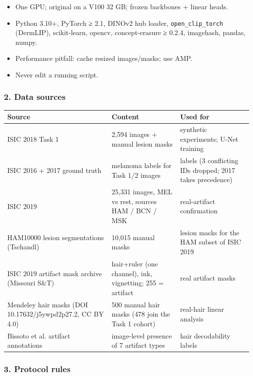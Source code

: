 {\begin{itemize}

\item
  One GPU; original on a V100 32 GB; frozen backbones + linear heads.
\item
  Python 3.10+, PyTorch ≥ 2.1, DINOv2 hub loader, \texttt{open\_clip\_torch} (DermLIP), scikit-learn, opencv, concept-erasure ≥ 0.2.4, imagehash, pandas, numpy.
\item
  Performance pitfall: cache resized images/masks; use AMP.
\item
  Never edit a running script.
\end{itemize}

\subsubsection{2. Data sources}\label{2-data-sources}

{ %
\begin{longtable}[]{@{}lll@{}}
\toprule\noalign{}
Source & Content & Used for \\
\midrule\noalign{}
\endhead
\bottomrule\noalign{}
\endlastfoot
ISIC 2018 Task 1 & 2,594 images + manual lesion masks & synthetic experiments; U-Net training \\
ISIC 2016 + 2017 ground truth & melanoma labels for Task 1/2 images & labels (3 conflicting IDs dropped; 2017 takes precedence) \\
ISIC 2019 & 25,331 images, MEL vs rest, sources HAM / BCN / MSK & real-artifact confirmation \\
HAM10000 lesion segmentations (Tschandl) & 10,015 manual masks & lesion masks for the HAM subset of ISIC 2019 \\
ISIC 2019 artifact mask archive (Missouri S\&T) & hair+ruler (one channel), ink, vignetting; 255 = artifact & real artifact masks \\
Mendeley hair masks (DOI 10.17632/j5ywpd2p27.2, CC BY 4.0) & 500 manual hair masks (478 join the Task 1 cohort) & real-hair linear analysis \\
Bissoto et al. artifact annotations & image-level presence of 7 artifact types & hair decodability labels \\
\end{longtable}
}

\subsubsection{3. Protocol rules}\label{3-protocol-rules}

}

